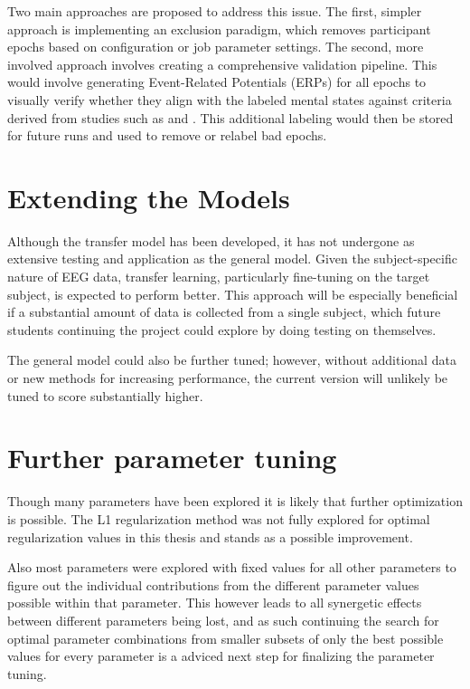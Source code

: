 Two main approaches are proposed to address this issue. The first, simpler approach is implementing an exclusion paradigm, which removes participant epochs based on configuration or job parameter settings. The second, more involved approach involves creating a comprehensive validation pipeline. This would involve generating Event-Related Potentials (ERPs) for all epochs to visually verify whether they align with the labeled mental states against criteria derived from studies such as \cite{Rodriguez-Larios2020} and \cite{DelormeEEGMeditationStudy}. This additional labeling would then be stored for future runs and used to remove or relabel bad epochs.

\section{Extending the Models}
Although the transfer model has been developed, it has not undergone as extensive testing and application as the general model. Given the subject-specific nature of EEG data, transfer learning, particularly fine-tuning on the target subject, is expected to perform better. This approach will be especially beneficial if a substantial amount of data is collected from a single subject, which future students continuing the project could explore by doing testing on themselves.

The general model could also be further tuned; however, without additional data or new methods for increasing performance, the current version will unlikely be tuned to score substantially higher.

\section{Further parameter tuning}
Though many parameters have been explored it is likely that further optimization is possible. The L1 regularization method was not fully explored for optimal regularization values in this thesis and stands as a possible improvement. 

Also most parameters were explored with fixed values for all other parameters to figure out the individual contributions from the different parameter values possible within that parameter. This however leads to all synergetic effects between different parameters being lost, and as such continuing the search for optimal parameter combinations from smaller subsets of only the best possible values for every parameter is a adviced next step for finalizing the parameter tuning.

